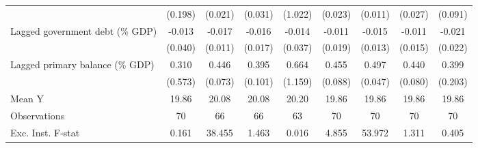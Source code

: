 {\begin{tabular}{l*{8}{c}}
                    &     (0.198)         &     (0.021)         &     (0.031)         &     (1.022)         &     (0.023)         &     (0.011)         &     (0.027)         &     (0.091)         \\
\addlinespace
Lagged government debt (\% GDP)&      -0.013         &      -0.017         &      -0.016         &      -0.014         &      -0.011         &      -0.015         &      -0.011         &      -0.021         \\
                    &     (0.040)         &     (0.011)         &     (0.017)         &     (0.037)         &     (0.019)         &     (0.013)         &     (0.015)         &     (0.022)         \\
\addlinespace
Lagged primary balance (\% GDP)&       0.310         &       0.446\sym{***}&       0.395\sym{***}&       0.664         &       0.455\sym{***}&       0.497\sym{***}&       0.440\sym{***}&       0.399\sym{**} \\
                    &     (0.573)         &     (0.073)         &     (0.101)         &     (1.159)         &     (0.088)         &     (0.047)         &     (0.080)         &     (0.203)         \\
\midrule
Mean Y              &       19.86         &       20.08         &       20.08         &       20.20         &       19.86         &       19.86         &       19.86         &       19.86         \\
Observations        &          70         &          66         &          66         &          63         &          70         &          70         &          70         &          70         \\
Exc. Inst. F-stat   &       0.161         &      38.455         &       1.463         &       0.016         &       4.855         &      53.972         &       1.311         &       0.405         \\
\bottomrule
\end{tabular}
}
